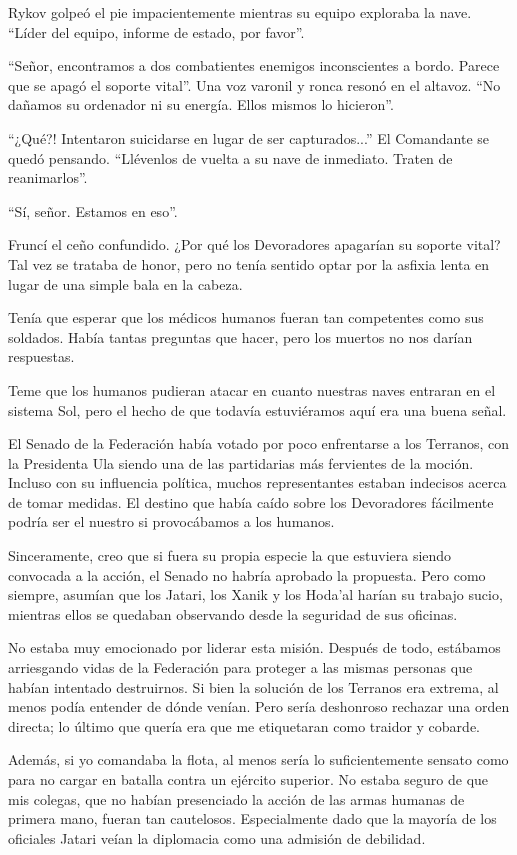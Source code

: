 \documentclass[spanish,12pt,a4paper,oneside,titlepage]{book}
\begin{document}
    Rykov golpeó el pie impacientemente mientras su equipo exploraba la nave. ``Líder del equipo, informe de estado, por favor''.

    ``Señor, encontramos a dos combatientes enemigos inconscientes a bordo. Parece que se apagó el soporte vital''. Una voz varonil y ronca resonó en el altavoz. ``No dañamos su ordenador ni su energía. Ellos mismos lo hicieron''.

    ``¿Qué?! Intentaron suicidarse en lugar de ser capturados...'' El Comandante se quedó pensando. ``Llévenlos de vuelta a su nave de inmediato. Traten de reanimarlos''.

    ``Sí, señor. Estamos en eso''.

    Fruncí el ceño confundido. ¿Por qué los Devoradores apagarían su soporte vital? Tal vez se trataba de honor, pero no tenía sentido optar por la asfixia lenta en lugar de una simple bala en la cabeza.

    Tenía que esperar que los médicos humanos fueran tan competentes como sus soldados. Había tantas preguntas que hacer, pero los muertos no nos darían respuestas.

    Teme que los humanos pudieran atacar en cuanto nuestras naves entraran en el sistema Sol, pero el hecho de que todavía estuviéramos aquí era una buena señal.

    El Senado de la Federación había votado por poco enfrentarse a los Terranos, con la Presidenta Ula siendo una de las partidarias más fervientes de la moción. Incluso con su influencia política, muchos representantes estaban indecisos acerca de tomar medidas. El destino que había caído sobre los Devoradores fácilmente podría ser el nuestro si provocábamos a los humanos.

    Sinceramente, creo que si fuera su propia especie la que estuviera siendo convocada a la acción, el Senado no habría aprobado la propuesta. Pero como siempre, asumían que los Jatari, los Xanik y los Hoda’al harían su trabajo sucio, mientras ellos se quedaban observando desde la seguridad de sus oficinas.

    No estaba muy emocionado por liderar esta misión. Después de todo, estábamos arriesgando vidas de la Federación para proteger a las mismas personas que habían intentado destruirnos. Si bien la solución de los Terranos era extrema, al menos podía entender de dónde venían. Pero sería deshonroso rechazar una orden directa; lo último que quería era que me etiquetaran como traidor y cobarde.

    Además, si yo comandaba la flota, al menos sería lo suficientemente sensato como para no cargar en batalla contra un ejército superior. No estaba seguro de que mis colegas, que no habían presenciado la acción de las armas humanas de primera mano, fueran tan cautelosos. Especialmente dado que la mayoría de los oficiales Jatari veían la diplomacia como una admisión de debilidad.
\end{document}
